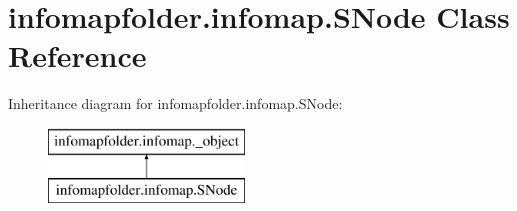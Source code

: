 \hypertarget{classinfomapfolder_1_1infomap_1_1SNode}{}\section{infomapfolder.\+infomap.\+S\+Node Class Reference}
\label{classinfomapfolder_1_1infomap_1_1SNode}
Inheritance diagram for infomapfolder.\+infomap.\+S\+Node\+:\begin{figure}[H]
\begin{center}
\leavevmode
\includegraphics[height=2.000000cm]{classinfomapfolder_1_1infomap_1_1SNode}
\end{center}
\end{figure}
